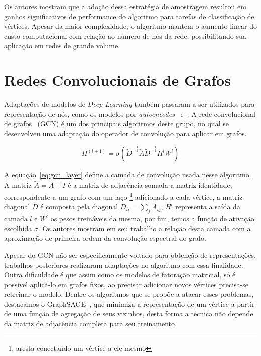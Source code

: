 Os autores mostram que a adoção dessa estratégia de amostragem resultou em
ganhos significativos de performance do algoritmo para tarefas de classificação
de vértices.
Apesar da maior complexidade, o algoritmo mantém o aumento linear do custo
computacional com relação ao número de nós da rede, possibilitando sua aplicação
em redes de grande volume.

\section{Redes Convolucionais de Grafos}

Adaptações de modelos de \textit{Deep Learning} também passaram a ser utilizados
para representação de nós, como os modelos por \textit{autoencodes}~\cite{wang16}
e~\cite{cao16}.
A rede convolucional de grafos~\cite{kipf16} (GCN) é um dos principais algoritmos
deste grupo, no qual se desenvolveu uma adaptação do operador de convolução para
aplicar em grafos.

\begin{equation} \label{eq:gcn_layer}
    H^{(l+1)} = \sigma (\tilde{D}^{-\frac{1}{2}} \tilde{A} \tilde{D}^{-\frac{1}{2}} H^l W^l)
\end{equation}

A equação~\ref{eq:gcn_layer} define a camada de convolução usada nesse
algoritmo.
A matriz $\tilde{A} = A + I$ é a matriz de adjacência somada a matriz
identidade, correspondente a um grafo com um laço \footnote{aresta conectando um
vértice a ele mesmo} adicionado a cada vértice, a matriz diagonal $\tilde{D}$ é
composta pela diagonal $\tilde{D}_{ii} = \sum_{j}\tilde{A}_{ij}$, $H^l$
representa a saída da camada $l$ e $W^l$ os pesos treináveis da mesma, por fim,
temos a função de ativação escolhida $\sigma$.
Os autores mostram em seu trabalho a relação desta camada com a aproximação de
primeira ordem da convolução espectral do grafo.

Apesar do GCN não ser especificamente voltado para obtenção de representações,
trabalhos posteriores realizaram adaptações no algoritmo com essa finalidade.
Outra dificuldade é que assim como os modelos de fatoração matricial, só é
possível aplicá-lo em grafos fixos, ao precisar adicionar novos vértices
precisa-se retreinar o modelo.
Dentre os algoritmos que se propõe a atacar esses problemas, destacamos o
GraphSAGE~\cite{hamilton17}, que minimiza a representação de um vértice a partir
de uma função de agregação de seus vizinhos, desta forma a técnica não depende
da matriz de adjacência completa para seu treinamento.

